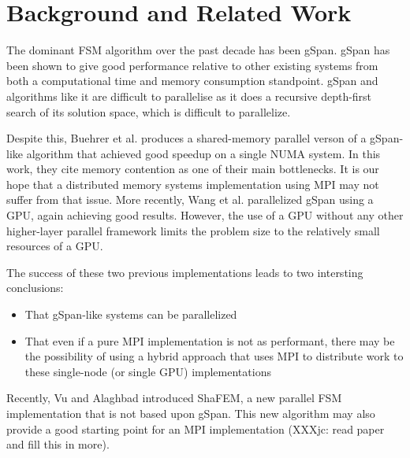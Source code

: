 \section{Background and Related Work}
\label{sec:background}

The dominant FSM algorithm over the past decade has been gSpan\cite{gspan}. 
gSpan has been shown to give good performance relative to other existing
systems from both a computational time and memory consumption standpoint.
gSpan and algorithms like it are difficult to parallelise as it does a 
recursive depth-first search of its solution space, which is difficult to 
parallelize.  

Despite this, Buehrer et al. produces a shared-memory
parallel verson of a gSpan-like algorithm that achieved good speedup on a 
single NUMA system\cite{buehrer2005parallel}.  In this work, they cite 
memory contention as one of their main bottlenecks. It is our hope that
a distributed memory systems implementation using MPI may not suffer
from that issue.  More recently, Wang et al. parallelized gSpan using a 
GPU\cite{gspancuda}, again achieving good results.  However, the use of a 
GPU without any other higher-layer parallel framework limits the problem
size to the relatively small resources of a GPU. 

The success of these two previous implementations leads to two intersting
conclusions:
\begin{itemize}
	\item{That gSpan-like systems can be parallelized}
	\item{That even if a pure MPI implementation is not as performant, 
		there may be the possibility of using a hybrid approach
		that uses MPI to distribute work to these single-node 
		(or single GPU) implementations}
\end{itemize}

Recently, Vu and Alaghbad introduced ShaFEM\cite{shafem}, a new parallel FSM 
implementation that is not based upon gSpan.  This new algorithm may also
provide a good starting point for an MPI implementation (XXXjc: read paper
and fill this in more).

